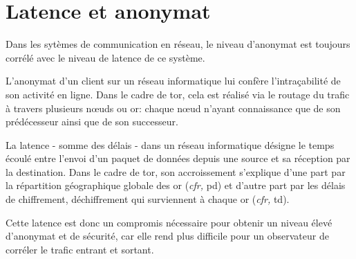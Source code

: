 \appendix
% 

% 

\section{Latence et anonymat}
Dans les sytèmes de communication en réseau, le niveau d'anonymat est toujours corrélé avec le niveau de latence de ce système.

L'anonymat d'un client sur un réseau informatique lui confère l'intraçabilité de son activité en ligne.
Dans le cadre de \acrshort{tor}, cela est réalisé via le routage du trafic à travers plusieurs n\oe uds ou \acrfull{or}: chaque n\oe ud n'ayant connaissance que de son prédécesseur ainsi que de son successeur.

La latence - somme des délais - dans un réseau informatique désigne le temps écoulé entre l'envoi d'un paquet de données depuis une source et sa réception par la destination.
Dans le cadre de \acrshort{tor}, son accroissement s'explique d'une part par la répartition géographique globale des \acrshort{or} (\textit{cfr,} \acrfull{pd}) et d'autre part par les délais de chiffrement, déchiffrement qui surviennent à chaque \acrshort{or} (\textit{cfr,} \acrfull{td}).

Cette latence est donc un compromis nécessaire pour obtenir un niveau élevé d'anonymat et de sécurité, car elle rend plus difficile pour un observateur de corréler le trafic entrant et sortant.




